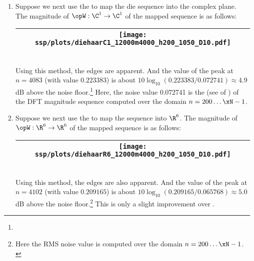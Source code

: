 \begin{example}
\begin{enumerate}
  \item \label{item:nonstat48_C1qpsk}
    Suppose we next use the   to map
    the die sequence into the complex plane.
    The magnitude of $\opW:\C^1\to\C^1$ of the mapped sequence is as follows:
    \\\begin{tabular}{|>{\scs}c|}
         \hline
         \texttt{[image: ssp/plots/diehaarC1\_12000m4000\_h200\_1050\_D10.pdf]}%
       \\\hline
    \end{tabular}\\
     Using this method, the edges are apparent.   
     And the value of the peak at $n=4083$ (with value $0.223383$) is about
     $10\log_{10}(0.223383/0.072741)\approx4.9$ dB above the noise 
     floor.\footnote{} 
    Here, the noise value 0.072741 is the  (see  of )
    of the DFT magnitude sequence computed over the domain $n=200\ldots\xN-1$.

     
  \item \label{item:nonstat48_R4}
    Suppose we next use the   to map
    the sequence into $\R^6$.
    The magnitude of $\opW:\R^6\to\R^6$ of the mapped sequence is as follows:
     \\\begin{tabular}{|>{\scs}c|}
          \hline
          \texttt{[image: ssp/plots/diehaarR6\_12000m4000\_h200\_1050\_D10.pdf]}%
        \\\hline
     \end{tabular}\\
     Using this method, the edges are also apparent.
     And the value of the peak at $n=4102$ (with value $0.209165$) is about 
     $10\log_{10}(0.209165/0.065768)\approx5.0$ dB above the noise 
     floor.\footnote{Here the RMS noise value is computed over the domain $n=200\ldots\xN-1$.\\ 
       } 
     This is only a slight improvement over .

\end{enumerate}
\end{example}


